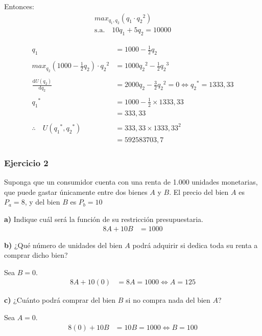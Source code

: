 \documentclass{templateNote}
\begin{document}
Entonces:
\begin{equation*}
    \begin{split}
        max_{q_1, q_2} (q_1 \cdot {q_2}^2) \\
        \text{s.a.} \quad 10q_1 + 5q_2 = 10000
    \end{split}
\end{equation*}

\begin{align*}
    q_1 &= 1000 - \frac{1}{2}q_2 \\
    \\
    max_{q_2} (1000 - \frac{1}{2}q_2) \cdot {q_2}^2 &= 1000{q_2}^2 - \frac{1}{2} {q_2}^3 \\
    \\
    \frac{\mathrm{d} U(q_2)}{\mathrm{d}q_2} &= 2000q_2 - \frac{3}{2} {q_2}^2 = 0 \Leftrightarrow {q_2}^* = 1333,33 \\
    \\
    {q_1}^* &= 1000 - \frac{1}{2} \times 1333,33 \\
    &= 333,33 \\
    \\
    \therefore \quad U({q_1}^*, {q_2}^*) &= 333,33 \times {1333,33}^2 \\
    &= 592583703,7
\end{align*}

\newpage
\subsubsection{Ejercicio 2}
\indent
Suponga que un consumidor cuenta con una renta de 1.000 unidades monetarias, que
puede gastar únicamente entre dos bienes $A$ y $B$. El precio del bien $A$ es $P_a = 8$, y del bien
$B$ es $P_b = 10$

\textbf{a)} Indique cuál será la función de su restricción presupuestaria.
\begin{align*}
    8A + 10B &= 1000
\end{align*}

\textbf{b)} ¿Qué número de unidades del bien $A$ podrá adquirir si dedica toda su renta a
comprar dicho bien?

Sea $B = 0$.
\begin{align*}
    8A + 10(0) &= 8A = 1000 \Leftrightarrow A = 125
\end{align*}

\textbf{c)} ¿Cuánto podrá comprar del bien $B$ si no compra nada del bien $A$?

Sea $A = 0$.
\begin{align*}
    8(0) + 10B &= 10B = 1000 \Leftrightarrow B = 100
\end{align*}
\end{document}
